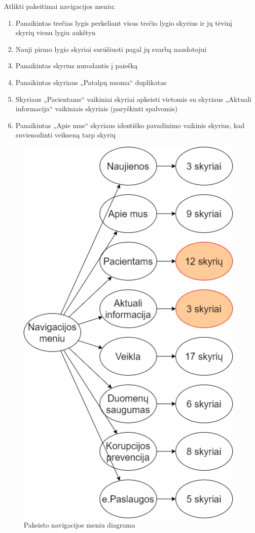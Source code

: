 \documentclass{VUMIFPSkursinis}
\begin{document}
Atlikti pakeitimai navigacijos meniu:
\begin{enumerate}
	\item Panaikintas trečias lygis perkeliant visus trečio lygio skyrius ir jų tėvinį skyrių vienu lygiu aukštyn
	\item Nauji pirmo lygio skyriai surūšiuoti pagal jų svarbą naudotojui
	\item Panaikintas skyrius nurodantis į paiešką
	\item Panaikintas skyriaus „Patalpų nuoma“ duplikatas
	\item Skyriaus „Pacientams“ vaikiniai skyriai apkeisti vietomis su skyriaus „Aktuali informacija“ vaikiniais skyriais (paryškinti spalvomis)
	\item Panaikintas „Apie mus“ skyriaus identiško pavadinimo vaikinis skyrius, kad suvienodinti veikseną tarp skyrių
\end{enumerate}

\begin{figure}[htb]
    \centering
    \includegraphics[scale=0.65]{img/NavigacijosMeniuPakeistas}
    \caption{Pakeisto navigacijos meniu diagrama}
    \label{img:NavigacijosMeniuPakeistas}
\end{figure}
\end{document}
